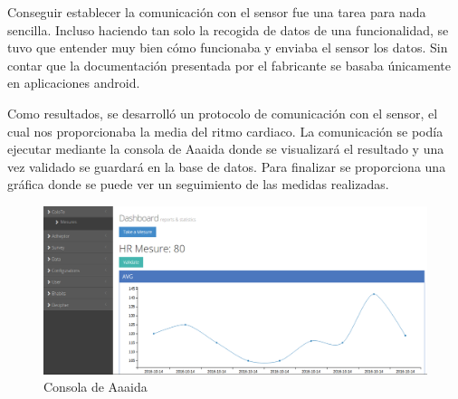 Conseguir establecer la comunicación con el sensor fue una tarea para nada sencilla. Incluso haciendo tan solo la recogida de datos de una funcionalidad, se tuvo que entender muy bien cómo funcionaba y enviaba el sensor los datos. Sin contar que la documentación presentada por el fabricante se basaba únicamente en aplicaciones android. 

Como resultados, se desarrolló un protocolo de comunicación con el sensor, el cual nos proporcionaba la media  del ritmo cardiaco. La comunicación se podía ejecutar mediante la consola de Aaaida donde se visualizará el resultado y una vez validado se guardará en la base de datos. Para finalizar se proporciona una gráfica donde se puede ver un seguimiento de las medidas realizadas. 

\begin{figure}[htb]
\begin{center}
\includegraphics[width=1\textwidth]{./setup/final}
\caption{Consola de Aaaida}
\end{center}
\end{figure}
\pagebreak


